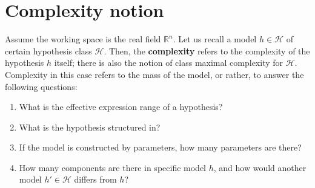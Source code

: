 \documentclass[
  journal=largetwo,
  year=2025,
  volume=37,
]{cup-journal}
\begin{document}
\section{Complexity notion}

Assume the working space is the real field $\mathbb{R}^{n}$. Let us recall a model $h\in\mathcal{H}$ of certain hypothesis class $\mathcal{H}$. Then, the \textbf{complexity} refers to the complexity of the hypothesis $h$ itself; there is also the notion of class maximal complexity for $\mathcal{H}$. Complexity in this case refers to the mass of the model, or rather, to answer the following questions:
\begin{enumerate}
    \item What is the effective expression range of a hypothesis?
    \item What is the hypothesis structured in?
    \item If the model is constructed by parameters, how many parameters are there?
    \item How many components are there in specific model $h$, and how would another model $h'\in \mathcal{H}$ differs from $h$?
\end{enumerate}
\end{document}
